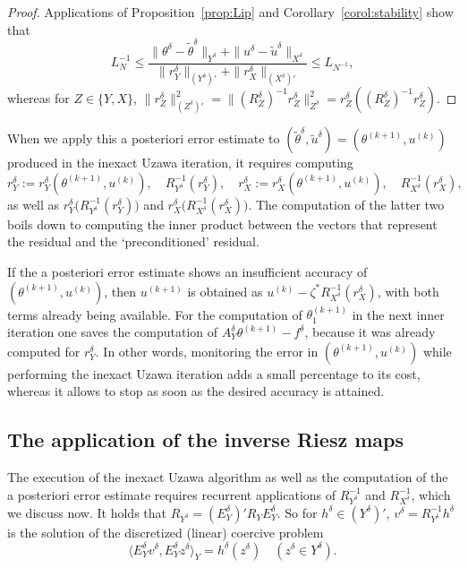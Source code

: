 \documentclass{amsart}
\numberwithin{equation}{section}
\newcommand{\1}{\mathbb 1}
\begin{document}
\begin{proof} Applications of Proposition~\ref{prop:Lip} and Corollary~\ref{corol:stability} show that
$$
L_N^{-1} \leq
 \frac{\|\theta^\delta-\tilde{\theta}^\delta\|_{Y^\delta}+\|u^\delta-\tilde{u}^\delta\|_{X^\delta}}
{\|r_Y^\delta\|_{(Y^\delta)' }+\|r_X^\delta\|_{(X^\delta)'}}\leq L_{N^{-1}},
$$
whereas for $Z\in \{Y,X\}$, $\|r_Z^\delta\|_{(Z^\delta)'}^2=\|(R_Z^{\delta})^{-1} r_Z^\delta\|_{Z^\delta}^2=r_Z^\delta((R_Z^{\delta})^{-1} r_Z^\delta)$.
\end{proof}

When we apply this a posteriori error estimate to $(\tilde{\theta}^\delta,\tilde{u}^\delta)=(\theta^{(k+1)},u^{(k)})$ produced in the inexact Uzawa iteration, it requires computing
$$
r_Y^\delta:=r_Y^\delta(\theta^{(k+1)},u^{(k)}),\quad R_{Y^\delta}^{-1}(r_Y^\delta),\quad  r_X^\delta:=r_X^\delta(\theta^{(k+1)},u^{(k)}), \quad R_{X^\delta}^{-1}(r_X^\delta),
$$
as well as  $r_Y^\delta\big(R_{Y^\delta}^{-1}(r_Y^\delta)\big)$ and $r_X^\delta\big(R_{X^\delta}^{-1}(r_X^\delta)\big)$. The computation of the latter two boils down to computing 
the inner product between the vectors that represent the residual and the `preconditioned' residual.

If the a posteriori error estimate shows an insufficient accuracy of $(\theta^{(k+1)},u^{(k)})$, then $u^{(k+1)}$ is obtained as $u^{(k)}-\zeta^* R_{X^\delta}^{-1}(r_X^\delta)$, with both terms already being available. For the computation of $\theta_1^{(k+1)}$  in the next inner iteration one saves the computation of $A_Y^\delta \theta^{(k+1)}-f^\delta$, because it was already computed for $r_Y^\delta$. In other words, monitoring the error in $(\theta^{(k+1)},u^{(k)})$ while performing the inexact Uzawa iteration adds a small percentage to its cost, whereas it allows to stop as soon as the desired accuracy is attained.
\medskip

\subsection{The application of the inverse Riesz maps}
The execution of the inexact Uzawa algorithm as well as the computation of the a posteriori error estimate requires recurrent applications of $R_{Y^\delta}^{-1}$ and $R_{X^\delta}^{-1}$, which we discuss now.
It holds that $R_{Y^\delta}=(E_Y^\delta)' R_Y E_Y^\delta$. So for $h^\delta \in (Y^\delta)'$, $v^\delta=R_{Y^\delta}^{-1} h^\delta$ is the solution of the discretized (linear) coercive problem
$$
\langle E_Y^\delta v^\delta,E_Y^\delta z^\delta\rangle_Y=h^\delta(z^\delta)\quad  (z^\delta \in Y^\delta). 
$$
\end{document}
